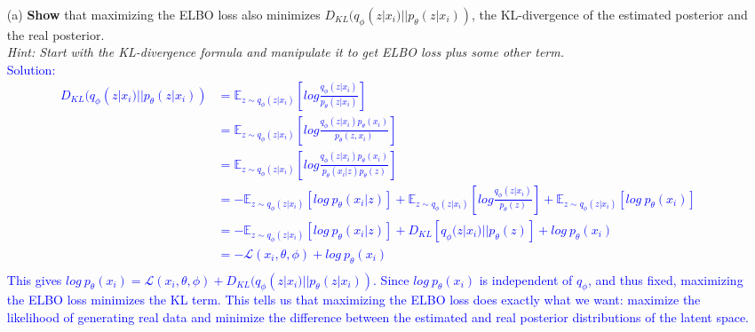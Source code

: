 \documentclass[a4paper]{article}
\begin{document}
\begin{itemize}
    \item [(a)] \textbf {Show} that maximizing the ELBO loss also minimizes \(D_{KL}(q_{\phi}(z|x_{i})||p_{\theta}(z|x_i))\), the KL-divergence of the estimated posterior and the real posterior. \\
    \emph {Hint: Start with the KL-divergence formula and manipulate it to get ELBO loss plus some other term.} \\
    \textcolor{blue}{Solution:
    \begin{align}
    D_{KL}(q_{\phi}(z|x_{i})||p_{\theta}(z|x_i)) 
    &= \mathbb{E}_{z\sim q_{\phi}(z|x_{i})} [log \frac{q_{\phi}(z|x_{i})}{p_{\theta}(z|x_i)}] \\
    &= \mathbb{E}_{z\sim q_{\phi}(z|x_{i})} [log \frac{q_{\phi}(z|x_{i})p_{\theta}(x_i)}{p_{\theta}(z, x_i)}] \\
    &= \mathbb{E}_{z\sim q_{\phi}(z|x_{i})} [log \frac{q_{\phi}(z|x_{i})p_{\theta}(x_i)}{p_{\theta}(x_i|z)p_{\theta}(z)}] \\
    &= -\mathbb{E}_{z\sim q_{\phi}(z|x_{i})} [log \: p_{\theta}(x_i|z)] + \mathbb{E}_{z\sim q_{\phi}(z|x_{i})} [log \frac{q_{\phi}(z|x_{i})}{p_{\theta}(z)}] + \mathbb{E}_{z\sim q_{\phi}(z|x_{i})} [log \: p_{\theta}(x_i)] \\
    &= -\mathbb{E}_{z\sim q_{\phi}(z|x_{i})} [log \: p_{\theta}(x_i|z)] + D_{KL}[q_{\phi}(z|x_{i}) || p_{\theta}(z)] + log \: p_{\theta}(x_i) \\
    &= -\mathcal{L}(x_{i}, \theta, \phi) + log \: p_{\theta}(x_i) \\
    \end{align}
    This gives \(log \: p_{\theta}(x_i) = \mathcal{L}(x_{i}, \theta, \phi) + D_{KL}(q_{\phi}(z|x_{i})||p_{\theta}(z|x_i)) \). Since \(log \: p_{\theta}(x_i)\) is independent of \(q_{\phi}\), and thus fixed, maximizing the ELBO loss minimizes the KL term. This tells us that maximizing the ELBO loss does exactly what we want: maximize the likelihood of generating real data and minimize the difference between the estimated and real posterior distributions of the latent space. 
    }
\end{itemize}
\end{document}
